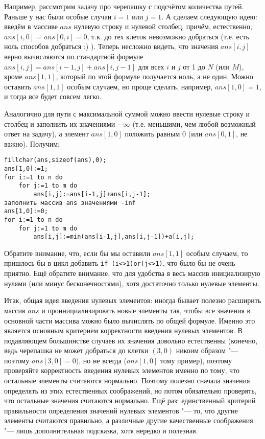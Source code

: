 Например, рассмотрим задачу про черепашку с подсчётом количества путей. Раньше у нас были особые случаи $i=1$ или $j=1$. А сделаем следующую идею: введём в массиве $ans$ нулевую строку и нулевой столбец, причём, естественно, $ans[i,0]=ans[0,i]=0$, т.к. до тех клеток невозможно добраться (т.е. есть ноль способов добраться :) ). Теперь несложно видеть, что значения $ans[i,j]$ верно вычисляются по стандартной формуле $ans[i,j]=ans[i-1,j]+ans[i,j-1]$ для всех $i$ и $j$ от 1 до $N$ (или $M$), кроме $ans[1,1]$, который по этой формуле получается ноль, а не один. Можно оставить $ans[1,1]$ особым случаем, но проще сделать, например, $ans[1,0]=1$, и тогда все будет совсем легко.

Аналогично для пути с максимальной суммой можно ввести нулевые строку и столбец и заполнить их значениями $-\infty$ (т.е. меньшими, чем любой возможный ответ на задачу), а элемент $ans[1,0]$ положить равным 0 (или $ans[0,1]$, не важно). Получим:
\begin{codesample}\begin{verbatim}
fillchar(ans,sizeof(ans),0);
ans[1,0]:=1;
for i:=1 to n do
    for j:=1 to m do
        ans[i,j]:=ans[i-1,j]+ans[i,j-1];
заполнить массив ans значениями -inf
ans[1,0]:=0;
for i:=1 to n do
    for j:=1 to m do
        ans[i,j]:=min(ans[i-1,j],ans[i,j-1])+a[i,j];
\end{verbatim}
\end{codesample}
 Обратите внимание, что, если бы мы оставили $ans[1,1]$ особым случаем, то пришлось бы в цикл добавить \verb'if (i<>1)or(j<>1)', что было бы не очень приятно. Ещё обратите внимание, что для удобства я весь массив инициализирую нулями (или минус бесконечностями), хотя достаточно только нулевые элементы.
 
Итак, общая идея введения нулевых элементов: иногда бывает полезно расширить массив $ans$ и
проинициализировать новые элементы так, чтобы все значения в основной части массива можно было
вычислять по общей формуле. Именно это является основным критерием корректности введения нулевых
элементов. В подавляющем большинстве случаев их значения довольно естественны (конечно, ведь
черепашка не может добраться до клетки $(3,0)$ никоим образом "--- поэтому $ans[3,0]=0$), но не
всегда ($ans[1,0]$ тому пример), поэтому проверяйте корректность введения нулевых элементов именно
по тому, что остальные элементы считаются нормально. Поэтому полезно сначала значения определять из
этих естественных соображений, но потом обязательно проверять, что остальные значения считаются
нормально. Ещё раз: единственный критерий правильности определения значений нулевых элементов "--- 
то, что другие элементы считаются правильно, а различные другие качественные соображения "--- 
лишь дополнительная подсказка, хотя нередко и полезная.

